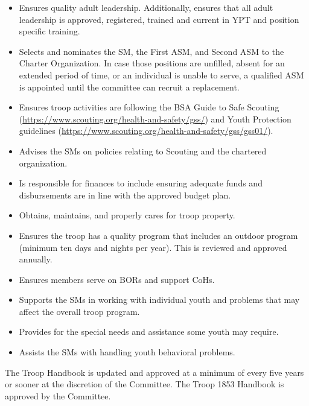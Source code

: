 \documentclass{ltxguide}
\begin{document}
\begin{itemize}
	\item Ensures quality adult leadership. Additionally, ensures that all adult leadership is approved, registered, trained and current in \ac{YPT} and position specific training.

	\item Selects and nominates the \ac{SM}, the First \ac{ASM}, and Second \ac{ASM} to the Charter Organization. In case those positions are unfilled, absent for an extended period of time, or an individual is unable to serve, a qualified \ac{ASM} is appointed until the committee can recruit a replacement.

	\item Ensures troop activities are following the \ac{BSA} Guide to Safe Scouting (\url{https://www.scouting.org/health-and-safety/gss/}) and Youth Protection guidelines (\url{https://www.scouting.org/health-and-safety/gss/gss01/}).

	\item Advises the \acp{SM} on policies relating to Scouting and the chartered organization.

	\item Is responsible for finances to include ensuring adequate funds and disbursements are in line with the approved budget plan.

	\item Obtains, maintains, and properly cares for troop property.

	\item Ensures the troop has a quality program that includes an outdoor program (minimum ten days and nights per year). This is reviewed and approved annually.

	\item Ensures members serve on \acp{BOR} and support \acp{CoH}.

	\item Supports the \acp{SM} in working with individual youth and problems that may affect the overall troop program.

	\item Provides for the special needs and assistance some youth may require.

	\item Assists the \acp{SM} with handling youth behavioral problems.
\end{itemize}
The Troop Handbook is updated and approved at a minimum of every five years or sooner at the discretion of the Committee. The Troop 1853 Handbook is approved by the Committee.
\end{document}
